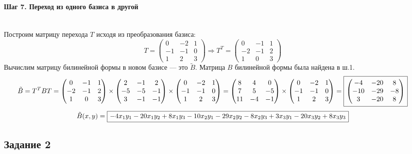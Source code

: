 \documentclass{article}
\newcommand*\squared[1]{\tikz[baseline=(char.base)]{
            \node[shape=rectangle,draw,inner sep=4pt] (char) {#1};}}
\begin{document}
\paragraph*{Шаг 7. Переход из одного базиса в другой} \, \\
Построим матрицу перехода $T$ исходя из преобразования базиса:
$$T = \begin{pmatrix}
0 & -2 & 1 \\
-1 & -1 & 0 \\
1 & 2 & 3
\end{pmatrix} \Rightarrow T^T = \begin{pmatrix}
0 & -1 & 1 \\
-2 & -1 & 2 \\
1 & 0 & 3
\end{pmatrix}$$
Вычислим матрицу билинейной формы в новом базисе --- это $\tilde{B}$. Матрица $B$ билинейной формы была найдена в ш.1.
$$\tilde{B} = T^TBT = \begin{pmatrix}
0 & -1 & 1 \\
-2 & -1 & 2 \\
1 & 0 & 3
\end{pmatrix}\times\begin{pmatrix}
2 & -1 & 2 \\
-5 & -5 & -1 \\
3 & -1 & -1
\end{pmatrix}\times\begin{pmatrix}
0 & -2 & 1 \\
-1 & -1 & 0 \\
1 & 2 & 3
\end{pmatrix} = \begin{pmatrix}
8 & 4 & 0 \\
7 & 5 & -5 \\
11 & -4 & -1
\end{pmatrix}\times\begin{pmatrix}
0 & -2 & 1 \\
-1 & -1 & 0 \\
1 & 2 & 3
\end{pmatrix} = \squared{$\begin{pmatrix}
-4 & -20 & 8 \\
-10 & -29 & -8 \\
3 & -20 & 8
\end{pmatrix}$}$$
$$\tilde{B}(x,y) = \squared{$-4x_1y_1 - 20x_1y_2 + 8x_1y_3 - 10x_2y_1 - 29x_2y_2 -8x_2y_3 + 3x_3y_1 - 20x_3y_2 + 8x_3y_3$}$$

\subsection*{Задание 2}
\end{document}
